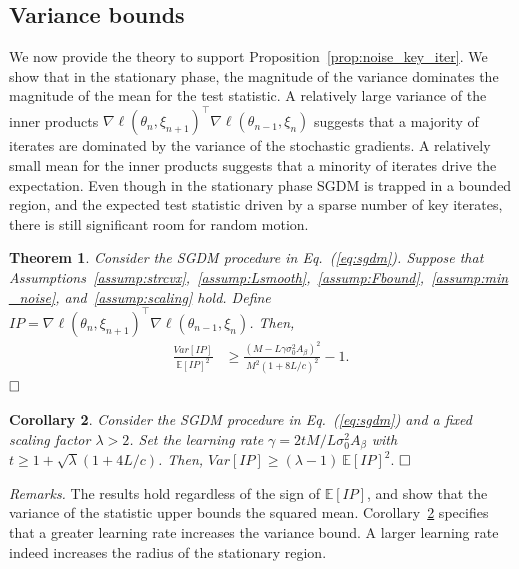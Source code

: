 \documentclass[conference]{IEEEtran}
\newcommand{\Ex}[1]{\mathbb{E}[ #1 ]}
\newtheorem{theorem}{Theorem}
\newtheorem{corollary}[theorem]{Corollary}
\begin{document}
\subsection{Variance bounds}
We now provide the theory to support Proposition~\ref{prop:noise_key_iter}. 
We show that in the stationary phase, the magnitude of the variance dominates the magnitude of the mean for the test statistic. 
A relatively large variance of the inner products $\nabla \ell (\theta_n, \xi_{n+1})^\top \nabla \ell (\theta_{n-1}, \xi_n)$ suggests that a majority of iterates are dominated by the variance of the stochastic gradients.
A relatively small mean for the inner products suggests that a minority of iterates drive the expectation. 
Even though in the stationary phase SGDM is trapped in a bounded region, and the expected test statistic driven by a sparse number of key iterates, there is still significant room for random motion.

\begin{theorem} 
\label{thm:ip_var_bound}
Consider the SGDM procedure in Eq.~(\ref{eq:sgdm}).
Suppose that Assumptions~\ref{assump:strcvx},~\ref{assump:Lsmooth},~\ref{assump:Fbound},~\ref{assump:min_noise}, and~\ref{assump:scaling} hold. Define\\ $IP = \nabla \ell(\theta_n, \xi_{n+1})^\top \nabla \ell(\theta_{n-1}, \xi_n)$. 
Then,
\begin{align*}
\frac{Var [ IP ]}{\mathbb{E} [ IP ]^2} 
&\geq \frac{ ( M - L \gamma \sigma_0^2 A_\beta )^2 }{M^2 ( 1 + 8 L / c )^2 } 
- 1.
\end{align*}
$\hfill\Box$
\end{theorem}
\vspace{0.08in}
\begin{corollary}
\label{cor:set_gamma_threshold}
Consider the SGDM procedure in Eq.~(\ref{eq:sgdm}) and a fixed scaling factor $\lambda > 2$.
Set the learning rate $\gamma = 2 t M / L \sigma_0^2 A_\beta$ with $t  \geq 1 + \sqrt{ \lambda } ( 1 + 4 L / c )$. 
Then, $Var [IP] \geq (\lambda - 1) \ \Ex{IP}^2.$ $\hfill\Box$
\end{corollary}

\emph{Remarks.}
The results hold regardless of the sign of $ \Ex{IP}$, and show that the variance of the statistic upper bounds the squared mean. 
Corollary~\ref{cor:set_gamma_threshold} specifies that a greater learning rate increases the variance bound.
A larger learning rate indeed increases the radius of the stationary region.
\end{document}
